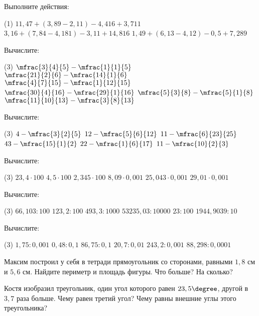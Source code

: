 \begin{class}[number=6]
	\begin{listofex}
		\item Выполните действия:
		\begin{tasks}(1)
			\task \( 11,47+(3,89-2,11)-4,416+3,711 \)
			\task \( 3,16+(7,84-4,181)-3,11+14,816 \)
			\task \( 1,49+(6,13-4,12)-0,5+7,289 \)
		\end{tasks}
		\item Вычислите:
		\begin{tasks}(3)
			\task \( \mfrac{3}{4}{5}-\mfrac{1}{1}{5} \)
			\task \( \mfrac{21}{2}{6}-\mfrac{14}{1}{6} \)
			\task \( \mfrac{4}{7}{15}-\mfrac{1}{12}{15} \)
			\task \( \mfrac{30}{4}{16}-\mfrac{29}{1}{16} \)
			\task \( \mfrac{5}{3}{8}-\mfrac{5}{1}{8} \)
			\task \( \mfrac{11}{10}{13}-\mfrac{3}{8}{13} \)
		\end{tasks}
		\item Вычислите:
		\begin{tasks}(3)
			\task \( 4-\mfrac{3}{2}{5} \)
			\task \( 12-\mfrac{5}{6}{12} \)
			\task \( 11-\mfrac{6}{23}{25} \)
			\task \( 43-\mfrac{15}{1}{2} \)
			\task \( 22-\mfrac{1}{6}{17} \)
			\task \( 11-\mfrac{10}{2}{3} \)
		\end{tasks}
		\item Вычислите:
		\begin{tasks}(3)
			\task \( 23,4\cdot100 \)
			\task\( 4,5 \cdot100 \)
			\task \( 2,345\cdot100 \)
			\task\( 8,09\cdot0,001 \) 
			\task\( 25,043 \cdot0,001  \)
			\task\( 29,01\cdot0,001   \)
		\end{tasks}
		\item Вычислите:
		\begin{tasks}(3)
			\task \( 66,103:100 \)
			\task \( 123,2:100 \)
			\task \( 493,3:1000 \)
			\task \( 53235,03:10000 \)
			\task \( 23:100 \)
			\task \( 1944,9039:10 \)
		\end{tasks}
		\item Вычислите:
		\begin{tasks}(3)
			\task \( 1,75:0,001 \)
			\task \( 0,48:0,1 \)
			\task \( 86,75:0,1\)
			\task \( 20,7:0,01 \)
			\task \( 243,2:0,001 \)
			\task \( 88,298:0,0001 \)
		\end{tasks}
		\item Максим построил у себя в тетради прямоугольник со сторонами, равными \( 1,8 \) см и \( 5,6 \) см. Найдите периметр и площадь фигуры. Что больше? На сколько?
		\item Костя изобразил треугольник, один угол которого равен \( 23,5\degree \), другой в \( 3,7 \) раза больше. Чему равен третий угол? Чему равны внешние углы этого треугольника?
	\end{listofex}
\end{class}


